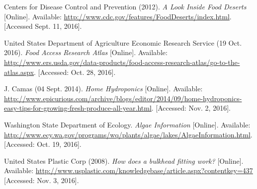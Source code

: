\documentclass[12pt]{article}
\begin{document}
\begin{thebibliography}{9}
    Centers for Disease Control and Prevention (2012).
    \textit{A Look Inside Food Deserts} [Online].
    Available: \url{http://www.cdc.gov/features/FoodDeserts/index.html}.
    [Accessed Sept. 11, 2016].

    United States Department of Agriculture Economic Research Service (19 Oct. 2016).
    \textit{Food Access Research Atlas} [Online].
    Available:
    \url{http://www.ers.usda.gov/data-products/food-access-research-atlas/go-to-the-atlas.aspx}.
    [Accessed: Oct. 28, 2016].

    J. Camas (04 Sept. 2014).
    \textit{Home Hydroponics} [Online].
    Available:
    \url{http://www.epicurious.com/archive/blogs/editor/2014/09/home-hydroponics-easy-tips-for-growing-fresh-produce-all-year.html}.
    [Accessed: Nov. 2, 2016].

    Washington State Department of Ecology.
    \textit{Algae Information} [Online].
    Available: \url{http://www.ecy.wa.gov/programs/wq/plants/algae/lakes/AlgaeInformation.html}.
    [Accessed: Oct. 19, 2016].

    United States Plastic Corp (2008).
    \textit{How does a bulkhead fitting work?} [Online].
    Available: \url{http://www.usplastic.com/knowledgebase/article.aspx?contentkey=437}
    [Accessed: Nov. 3, 2016].

\end{thebibliography}
\end{document}

